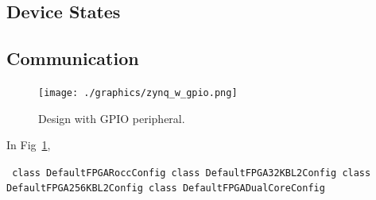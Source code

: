 \documentclass[]{IEEEtran}
\begin{document}
\subsection {Device States}


\subsection{Communication}


\begin{figure} %
\centering
\texttt{[image: ./graphics/zynq\_w\_gpio.png]}
\centering
\caption{Design with GPIO peripheral.}
\label{fig:gpio}
\end{figure}

In Fig~\ref{fig:gpio}, 

\tt{
class DefaultFPGARoccConfig \newline
class DefaultFPGA32KBL2Config \newline
class DefaultFPGA256KBL2Config \newline
class DefaultFPGADualCoreConfig}\rm{}



%
%

\end{document}

